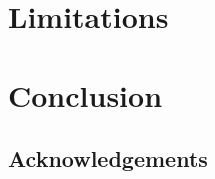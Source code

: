 \documentclass[acmlarge,review,anonymous]{acmart}\settopmatter{printfolios=true}
\begin{document}

\section{Limitations}
\label{sect.limitations}


\section{Conclusion}
\label{sect.conclusion}

\subsection*{Acknowledgements}

{}
\end{document}
